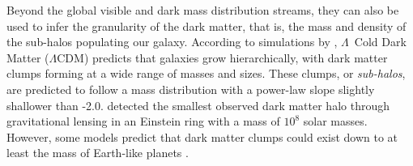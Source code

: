 \documentclass{aa}
\begin{document}
  
  
  Beyond the global visible and dark mass distribution streams, they can also be used to infer the granularity of the dark matter, that is, the mass and density of the sub-halos populating our galaxy. According to simulations by \citet{2008MNRAS.391.1685S}, $\Lambda$~Cold Dark Matter ($\Lambda$CDM) predicts that galaxies grow hierarchically, with dark matter clumps forming at a wide range of masses and sizes. These clumps, or \textit{sub-halos}, are predicted to follow a mass distribution with a power-law slope slightly shallower than -2.0. \citet{2012Natur.481..341V} detected the smallest observed dark matter halo through gravitational lensing in an Einstein ring with a mass of $10^8$ solar masses. However, some models predict that dark matter clumps could exist down to at least the mass of Earth-like planets \citep[see][and discussion in \citet{2021arXiv211101148A}]{2005JCAP...08..003G}. 
\end{document}
